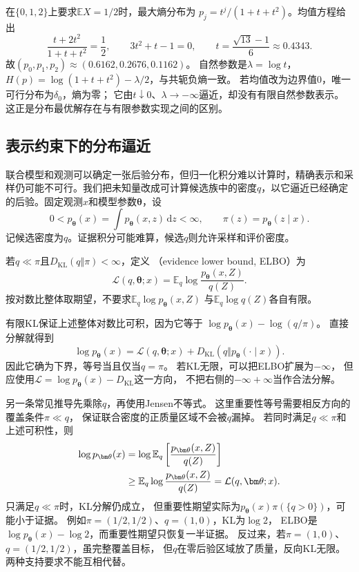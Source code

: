 在\(\{0,1,2\}\)上要求\(\mathbb EX=1/2\)时，最大熵分布为
\(p_j=t^j/(1+t+t^2)\)。均值方程给出
\[
  \frac{t+2t^2}{1+t+t^2}=\frac12,\qquad
  3t^2+t-1=0,\qquad
  t=\frac{\sqrt{13}-1}{6}\approx0.4343.
\]
故\((p_0,p_1,p_2)\approx(0.6162,0.2676,0.1162)\)。
自然参数是\(\lambda=\log t\)，
\(H(p)=\log(1+t+t^2)-\lambda/2\)，与共轭负熵一致。
若均值改为边界值\(0\)，唯一可行分布为\(\delta_0\)，熵为零；
它由\(t\downarrow0\)、\(\lambda\to-\infty\)逼近，却没有有限自然参数表示。
这正是分布最优解存在与有限参数实现之间的区别。

\subsection{表示约束下的分布逼近}
\label{sec:information-elbo-approximation}

联合模型和观测可以确定一张后验分布，但归一化积分难以计算时，精确表示和采样仍可能不可行。我们把未知量改成可计算候选族中的密度\(q\)，以它逼近已经确定的后验。固定观测\(x\)和模型参数\(\bm\theta\)，设
\[
  0<p_{\bm\theta}(x)=\int p_{\bm\theta}(x,z)\,\mathrm dz<\infty,
  \qquad
  \pi(z)=p_{\bm\theta}(z\mid x).
\]
记候选密度为\(q\)。证据积分可能难算，候选\(q\)则允许采样和评价密度。

\begin{definition}[证据下界]
\label{def:information-elbo}
若\(q\ll\pi\)且\(D_{\mathrm{KL}}(q\Vert\pi)<\infty\)，定义
（evidence lower bound, ELBO）为
\[
  \mathcal L(q,\bm\theta;x)
  =\mathbb E_q\log\frac{p_{\bm\theta}(x,Z)}{q(Z)}.
\]
按对数比整体取期望，不要求\(\mathbb E_q\log p_{\bm\theta}(x,Z)\)
与\(\mathbb E_q\log q(Z)\)各自有限。
\end{definition}

有限KL保证上述整体对数比可积，因为它等于
\(\log p_{\bm\theta}(x)-\log(q/\pi)\)。
直接分解就得到
\begin{equation}
  \log p_{\bm\theta}(x)
  =\mathcal L(q,\bm\theta;x)+D_{\mathrm{KL}}(q\Vert p_{\bm\theta}(\cdot\mid x)).
  \label{eq:information-elbo-decomposition}
\end{equation}
因此它确为下界，等号当且仅当\(q=\pi\)。
若KL无限，可以把ELBO扩展为\(-\infty\)，
但应使用\(\mathcal L=\log p_{\bm\theta}(x)-D_{\mathrm{KL}}\)这一方向，
不把右侧的\(-\infty+\infty\)当作合法分解。

另一条常见推导先乘除\(q\)，再使用Jensen不等式。
这里重要性等号需要相反方向的覆盖条件\(\pi\ll q\)，
保证联合密度的正质量区域不会被\(q\)漏掉。
若同时满足\(q\ll\pi\)和上述可积性，则
\begin{align}
  \log p_{\bm\theta}(x)
  &=\log\mathbb E_q\left[\frac{p_{\bm\theta}(x,Z)}{q(Z)}\right]\notag\\
  &\geq\mathbb E_q\log\frac{p_{\bm\theta}(x,Z)}{q(Z)}
   =\mathcal L(q,\bm\theta;x).
  \label{eq:information-elbo-jensen}
\end{align}
只满足\(q\ll\pi\)时，KL分解仍成立，
但重要性期望实际为\(p_{\bm\theta}(x)\pi(\{q>0\})\)，可能小于证据。
例如\(\pi=(1/2,1/2)\)、\(q=(1,0)\)，KL为\(\log2\)，
ELBO是\(\log p_{\bm\theta}(x)-\log2\)，而重要性期望只恢复一半证据。
反过来，若\(\pi=(1,0)\)、\(q=(1/2,1/2)\)，虽完整覆盖目标，
但\(q\)在零后验区域放了质量，反向KL无限。两种支持要求不能互相代替。

